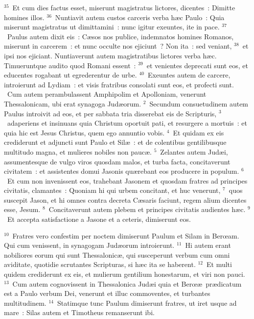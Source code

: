 ${}^{35}$~Et cum dies factus esset, miserunt magistratus lictores, dicentes~: Dimitte homines illos.
${}^{36}$~Nuntiavit autem custos carceris verba h\ae c Paulo~: Quia miserunt magistratus ut dimittamini~: nunc igitur exeuntes, ite in pace.
${}^{37}$~Paulus autem dixit eis~: C\ae sos nos publice, indemnatos homines Romanos, miserunt in carcerem~: et nunc occulte nos ejiciunt~? Non ita~: sed veniant,
${}^{38}$~et ipsi nos ejiciant. Nuntiaverunt autem magistratibus lictores verba h\ae c. Timueruntque audito quod Romani essent~:
${}^{39}$~et venientes deprecati sunt eos, et educentes rogabant ut egrederentur de urbe.
${}^{40}$~Exeuntes autem de carcere, introierunt ad Lydiam~: et visis fratribus consolati sunt eos, et profecti sunt.
~\lettrine[lines=10,image=true,loversize=0.05,lraise=-0.03]{C}{}um autem perambulassent Amphipolim et Apolloniam, venerunt Thessalonicam, ubi erat synagoga Jud\ae orum.
${}^{2}$~Secundum consuetudinem autem Paulus introivit ad eos, et per sabbata tria disserebat eis de Scripturis,
${}^{3}$~adaperiens et insinuans quia Christum oportuit pati, et resurgere a mortuis~: et quia hic est Jesus Christus, quem ego annuntio vobis.
${}^{4}$~Et quidam ex eis crediderunt et adjuncti sunt Paulo et Sil\ae~: et de colentibus gentilibusque multitudo magna, et mulieres nobiles non pauc\ae .
${}^{5}$~Zelantes autem Jud\ae i, assumentesque de vulgo viros quosdam malos, et turba facta, concitaverunt civitatem~: et assistentes domui Jasonis qu\ae rebant eos producere in populum.
${}^{6}$~Et cum non invenissent eos, trahebant Jasonem et quosdam fratres ad principes civitatis, clamantes~: Quoniam hi qui urbem concitant, et huc venerunt,
${}^{7}$~quos suscepit Jason, et hi omnes contra decreta C\ae saris faciunt, regem alium dicentes esse, Jesum.
${}^{8}$~Concitaverunt autem plebem et principes civitatis audientes h\ae c.
${}^{9}$~Et accepta satisfactione a Jasone et a ceteris, dimiserunt eos.


${}^{10}$~Fratres vero confestim per noctem dimiserunt Paulum et Silam in Berœam. Qui cum venissent, in synagogam Jud\ae orum introierunt.
${}^{11}$~Hi autem erant nobiliores eorum qui sunt Thessalonic\ae , qui susceperunt verbum cum omni aviditate, quotidie scrutantes Scripturas, si h\ae c ita se haberent.
${}^{12}$~Et multi quidem crediderunt ex eis, et mulierum gentilium honestarum, et viri non pauci.
${}^{13}$~Cum autem cognovissent in Thessalonica Jud\ae i quia et Berœ\ae\ pr\ae dicatum est a Paulo verbum Dei, venerunt et illuc commoventes, et turbantes multitudinem.
${}^{14}$~Statimque tunc Paulum dimiserunt fratres, ut iret usque ad mare~: Silas autem et Timotheus remanserunt ibi.


